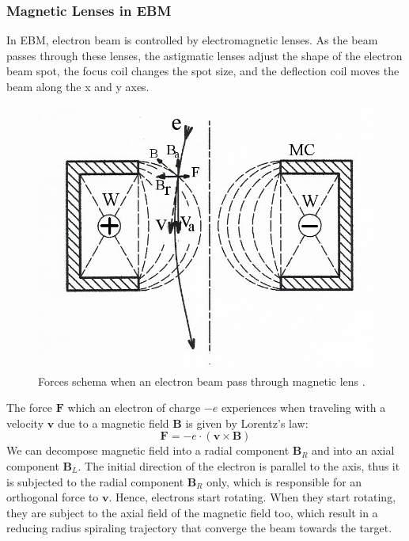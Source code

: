 \subsubsection{Magnetic Lenses in EBM}
\label{sssec:magneticlens}
In EBM, electron beam is controlled by electromagnetic lenses. As the beam passes through these lenses, the astigmatic lenses adjust the shape of the electron beam spot, the focus coil changes the spot size, and the deflection coil moves the beam along the x and y axes.
\begin{figure}
    \centering
    \includegraphics[scale=0.9]{Images/Magnetic_lens.jpg}
    \caption[Magnetic lens.]{Forces schema when an electron beam pass through magnetic lens \cite{wikipedia_magnetic_2023}.}
    \label{fig:magneticlens}
\end{figure}
The force $\mathbf{F}$ which an electron of charge $-e$ experiences when traveling with a velocity $\mathbf{v}$ due to a magnetic field $\mathbf{B}$ is given by Lorentz's law:
\begin{equation}
    \mathbf{F} = -e\cdot \left( \mathbf{v} \times \mathbf{B}\right)
\end{equation}
We can decompose magnetic field into a radial component $\mathbf{B}_R$ and into an axial component $\mathbf{B}_L$. The initial direction of the electron is parallel to the axis, thus it is subjected to the radial component $\mathbf{B}_R$ only, which is responsible for an orthogonal force to $\mathbf{v}$. Hence, electrons start rotating. When they start rotating, they are subject to the axial field of the magnetic field too, which result in a reducing radius spiraling trajectory that converge the beam towards the target.
